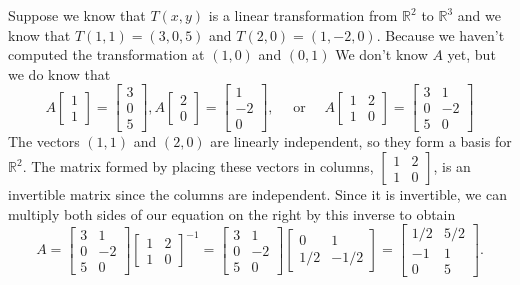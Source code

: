 \begin{example}
Suppose we know that $T(x,y)$ is a linear transformation from $\mathbb{R}^2$ to $\mathbb{R}^3$ and we know that $T(1,1)=(3,0,5)$ and $T(2,0)=(1,-2,0)$. Because we haven't computed the transformation at $(1,0)$ and $(0,1)$
We don't know $A$ yet, but we do know that 
$$
A\begin{bmatrix}1\\1\end{bmatrix} = \begin{bmatrix}3\\0\\5\end{bmatrix}, 
A\begin{bmatrix}2\\0\end{bmatrix} = \begin{bmatrix}1\\-2\\0\end{bmatrix},\quad \text{ or  } \quad
A\begin{bmatrix}1&2\\1&0\end{bmatrix} = \begin{bmatrix}3&1\\0&-2\\5&0\end{bmatrix}
$$  
The vectors $(1,1)$ and $(2,0)$ are linearly independent, so they form a basis for $\mathbb{R}^2$. The matrix formed by placing these vectors in columns, $\begin{bmatrix}1&2\\1&0\end{bmatrix}$, is an invertible matrix since the columns are independent. Since it is invertible, we can multiply both sides of our equation on the right by this inverse to obtain $$A= \begin{bmatrix}3&1\\0&-2\\5&0\end{bmatrix}\begin{bmatrix}1&2\\1&0\end{bmatrix}^{-1} = \begin{bmatrix}3&1\\0&-2\\5&0\end{bmatrix}\begin{bmatrix}0&1\\1/2&-1/2\end{bmatrix} =\begin{bmatrix}1/2&5/2\\-1&1\\0&5\end{bmatrix}.$$ 

\end{example}
